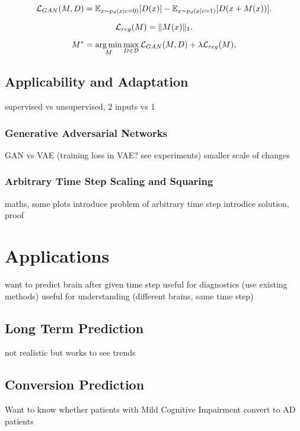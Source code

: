 \begin{equation}
	\mathcal{L}_{GAN}(M, D) = \mathbb{E} _ { x \sim p_d(x | c = 0) } [ D (x) ] 
	 - \mathbb{E} _ { x \sim p_d(x | c = 1) } [ D (x + M(x)) ].
\end{equation}

\begin{equation}
	\mathcal{L}_{reg} (M) = \lVert M(x)\rVert_1.
\end{equation}

\begin{equation}
	M^* = \operatorname*{arg\,min}_M \max_{D \in \mathcal{D}} \mathcal{L}_{GAN}(M, D) + \lambda \mathcal{L}_{reg} (M),
\end{equation}


\section{Applicability and Adaptation}
supervised vs unsupervised, 2 inputs vs 1

\subsection{Generative Adversarial Networks}
GAN vs VAE (training loss in VAE? see experiments)
smaller scale of changes

\subsection{Arbitrary Time Step Scaling and Squaring}
maths, some plots
introduce problem of arbitrary time step
introdice solution, proof

\chapter{Applications}

want to predict brain after given time step
useful for diagnostics (use existing methods)
useful for understanding (different brains, same time step)

\section{Long Term Prediction}
not realistic but works to see trends

\section{Conversion Prediction}
Want to know whether patients with Mild Cognitive Impairment convert to AD patients

